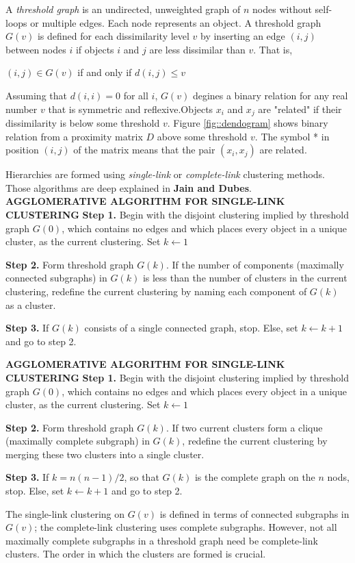A \textit{threshold graph} is an undirected, unweighted graph of $n$ nodes without self-loops or multiple edges. Each node represents an object. A threshold graph $G(v)$ is defined for each dissimilarity level $v$ by inserting an edge $(i, j)$ between nodes $i$ if objects $i$ and $j$ are less dissimilar than $v$. That is,

\centerline{$(i, j) \in G(v)$ if and only if $d(i, j) \leq v$}

Assuming that $d(i, i) = 0$ for all $i$, $G(v)$ degines a binary relation for any real number $v$ that is symmetric and reflexive.Objects $x_i$ and $x_j$ are "related" if their dissimilarity is below some threshold $v$. Figure \ref{fig::dendogram} shows binary relation from a proximity matrix $D$ above some threshold $v$. The symbol * in position $(i, j)$ of the matrix means that the pair $(x_i, x_j)$ are related.

Hierarchies are formed using \textit{single-link} or \textit{complete-link} clustering methods. Those algorithms are deep explained in \textbf{Jain and Dubes}. \\

\textbf{AGGLOMERATIVE ALGORITHM FOR SINGLE-LINK CLUSTERING}
\textbf{Step 1.} Begin with the disjoint clustering implied by threshold graph $G(0)$, which contains no edges and which places every object in a unique cluster, as the current clustering. Set $k \leftarrow 1$

\textbf{Step 2.} Form threshold graph $G(k)$. If the number of components (maximally connected subgraphs) in $G(k)$ is less than the number of clusters in the current clustering, redefine the current clustering by naming each component of $G(k)$ as a cluster.

\textbf{Step 3.} If $G(k)$ consists of a single connected graph, stop. Else, set $k \leftarrow k + 1$ and go to step 2.

\textbf{AGGLOMERATIVE ALGORITHM FOR SINGLE-LINK CLUSTERING}
\textbf{Step 1.} Begin with the disjoint clustering implied by threshold graph $G(0)$, which contains no edges and which places every object in a unique cluster, as the current clustering. Set $k \leftarrow 1$

\textbf{Step 2.} Form threshold graph $G(k)$. If two current clusters form a clique (maximally complete subgraph) in $G(k)$, redefine the current clustering by merging these two clusters into a single cluster.

\textbf{Step 3.} If $k = n(n-1)/2$, so that $G(k)$ is the complete graph on the $n$ nods, stop. Else, set $k \leftarrow k + 1$ and go to step 2.

The single-link clustering on $G(v)$ is defined in terms of connected subgraphs in $G(v)$; the complete-link clustering uses complete subgraphs. However, not all maximally complete subgraphs in a threshold graph need be complete-link clusters. The order in which the clusters are formed is crucial.